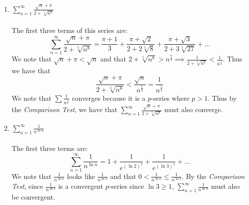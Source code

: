 \documentclass[12pt,letterpaper]{article}
\theoremstyle{case}
\theoremstyle{definition}
\begin{document}
\begin{enumerate}
\begin{enumerate}
			\item $\displaystyle\sum_{n=1}^{\infty} \frac{\sqrt{n} + \pi}{2+\sqrt[5]{n^8}}$
			\\\\The first three terms of this series are:
			\[\sum_{n=1}^{\infty} \frac{\sqrt{n} + \pi}{2+\sqrt[5]{n^8}} = \frac{\pi + 1}{3} + \frac{\pi + \sqrt{2}}{2+2 \sqrt[5]{8}}+\frac{\pi + \sqrt{3}}{2+3\sqrt[5]{27}}+ \dots\]
			We note that $\sqrt{n}+\pi < \sqrt{n}$ and that $2+\sqrt[5]{n^8} > n^{\frac{7}{4}} \implies \frac{1}{2+\sqrt[5]{n^8}} < \frac{1}{n^{\frac{7}{4}}}$. Thus we have that
			\[\frac{\sqrt{n}+\pi}{2+\sqrt[5]{n^8}}< \frac{\sqrt{n}}{n^{\frac{7}{4}}}=\frac{1}{n^\frac{5}{4}}\]
			We note that $\sum \frac{1}{n^\frac{5}{4}}$ converges because it is a $p$-series where $p > 1$. Thus by the \textit{Comparison Test}, we have that $\displaystyle\sum_{n=1}^{\infty} \frac{\sqrt{n}+\pi}{2+\sqrt[5]{n^8}}$ must also converge.\\
			\item $\displaystyle\sum_{n=1}^{\infty} \frac{1}{n^{\ln n}}$
			\\\\The first three terms are:
			\[\sum_{n=1}^{\infty} \frac{1}{n^{\ln n}}=1+\frac{1}{e^{(\ln 2)^2}}+\frac{1}{e^{(\ln 3)^2}}+\dots\]
			We note that $\frac{1}{n^{\ln n}}$ looks like $\frac{1}{n^{\ln 3}}$ and that $0 < \displaystyle\frac{1}{n^{\ln n}} \leq \frac{1}{n^{\ln 3}}$. By the \textit{Comparison Test}, since $\displaystyle\frac{1}{n^{\ln 3}}$ is a convergent $p$-series since $\ln 3 \geq 1$, $\displaystyle\sum_{n=1}^{\infty} \frac{1}{n^{\ln n}}$ must also be convergent. \\
			

\end{enumerate}
\end{enumerate}
\end{document}
